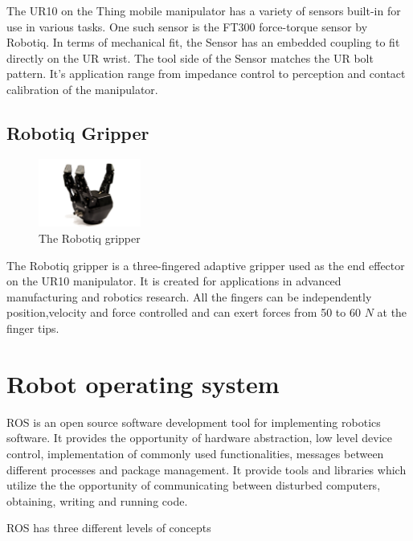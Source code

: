 \documentclass[times, utf8, diplomski, english]{fer}
\begin{document}
The UR10 on the Thing mobile manipulator has a variety of sensors built-in for use in various tasks.
One such sensor is the FT300 force-torque sensor by Robotiq.
In terms of mechanical fit, the Sensor has an embedded coupling to fit directly on the UR wrist. The tool side of the Sensor matches the UR bolt pattern. 
It's application range from impedance control to perception and contact calibration of the manipulator.


\section{Robotiq Gripper}
\begin{figure}[h]
\centering
\includegraphics[width=0.3\textwidth]{robotiq}
\caption{The Robotiq gripper}
\end{figure}
The Robotiq gripper is a three-fingered adaptive gripper used as the end effector on the UR10 manipulator.
It is created for applications in advanced manufacturing and robotics research. 
All the fingers can be independently position,velocity and force controlled and can exert forces from 50 to 60 $N$ at the finger tips.

\chapter{Robot operating system}\label{sec:def_ROS}
ROS is an open source software development tool for implementing robotics software. It provides the opportunity of hardware abstraction, low level device control, implementation of commonly used functionalities, messages between different processes and package management. It provide tools and libraries which utilize the the opportunity of communicating between disturbed computers, obtaining, writing and running code.


ROS has three different levels of concepts
\end{document}
